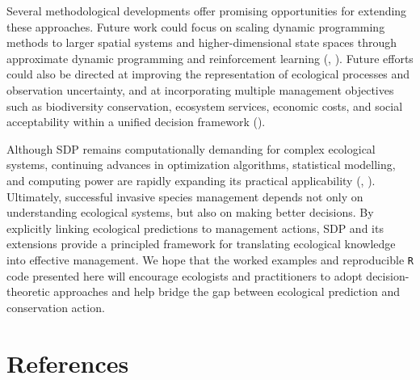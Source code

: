 \documentclass[
  11pt,
  a4paper,
]{article}
\begin{document}
Several methodological developments offer promising opportunities for extending these approaches. Future work could focus on scaling dynamic programming methods to larger spatial systems and higher-dimensional state spaces through approximate dynamic programming and reinforcement learning (, ). Future efforts could also be directed at improving the representation of ecological processes and observation uncertainty, and at incorporating multiple management objectives such as biodiversity conservation, ecosystem services, economic costs, and social acceptability within a unified decision framework ().

Although SDP remains computationally demanding for complex ecological systems, continuing advances in optimization algorithms, statistical modelling, and computing power are rapidly expanding its practical applicability (, ). Ultimately, successful invasive species management depends not only on understanding ecological systems, but also on making better decisions. By explicitly linking ecological predictions to management actions, SDP and its extensions provide a principled framework for translating ecological knowledge into effective management. We hope that the worked examples and reproducible \texttt{R} code presented here will encourage ecologists and practitioners to adopt decision-theoretic approaches and help bridge the gap between ecological prediction and conservation action.

\section{References}\label{references}
\end{document}
